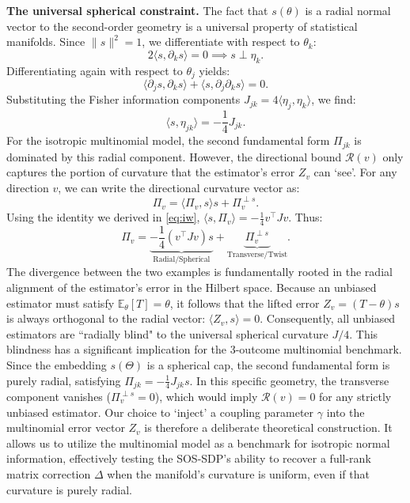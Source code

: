 \documentclass[pdflatex,sn-mathphys-num]{sn-jnl}%
\theoremstyle{thmstyleone}%
\theoremstyle{thmstyletwo}%
\theoremstyle{thmstylethree}%
\begin{document}
\noindent
\textbf{The universal spherical constraint.} The fact that $s(\theta)$ is a radial normal vector to the second-order geometry is a universal property of statistical manifolds. Since $\|s\|^2 = 1$, we differentiate with respect to $\theta_k$:
$$2\langle s, \partial_k s \rangle = 0 \implies s \perp \eta_k.$$
Differentiating again with respect to $\theta_j$ yields:
$$\langle \partial_j s, \partial_k s \rangle + \langle s, \partial_j \partial_k s \rangle = 0.$$
Substituting the Fisher information components $J_{jk} = 4\langle \eta_j, \eta_k \rangle$, we find:
\begin{equation}
\label{eq:iw}
\langle s, \eta_{jk} \rangle = -\frac{1}{4} J_{jk}.
\end{equation}
For the isotropic multinomial model, the second fundamental form $\Pi_{jk}$ is dominated by this radial component. However, the directional bound $\mathcal{R}(v)$ only captures the portion of curvature that the estimator's error $Z_v$ can `see'. 
For any direction $v$, we can write the directional curvature vector as:
$$\Pi_v = \langle \Pi_v, s \rangle s + \Pi_v^{\perp s}.$$
Using the identity we derived in \eqref{eq:iw}, $\langle s, \Pi_v \rangle = -\frac{1}{4} v^\top J v$. Thus:
$$\Pi_v = \underbrace{-\frac{1}{4} (v^\top J v) s}_{\text{Radial/Spherical}} + \underbrace{\Pi_v^{\perp s}}_{\text{Transverse/Twist}}.$$
The divergence between the two examples is fundamentally rooted in the radial alignment of the estimator's error in the Hilbert space. Because an unbiased estimator must satisfy $\mathbb{E}_\theta[T] = \theta$, it follows that the lifted error $Z_v = (T-\theta)s$ is always orthogonal to the radial vector: $\langle Z_v, s \rangle = 0$. Consequently, all unbiased estimators are ``radially blind" to the universal spherical curvature $J/4$. This blindness has a significant implication for the 3-outcome multinomial benchmark. Since the embedding $s(\Theta)$ is a spherical cap, the second fundamental form is purely radial, satisfying $\Pi_{jk} = -\frac{1}{4} J_{jk} s$. In this specific geometry, the transverse component vanishes ($\Pi_v^{\perp s} = 0$), which would imply $\mathcal{R}(v) = 0$ for any strictly unbiased estimator. Our choice to `inject' a coupling parameter $\gamma$ into the multinomial error vector $Z_v$ is therefore a deliberate theoretical construction. It allows us to utilize the multinomial model as a benchmark for isotropic normal information, effectively testing the SOS-SDP's ability to recover a full-rank matrix correction $\Delta$ when the manifold's curvature is uniform, even if that curvature is purely radial.
\end{document}

